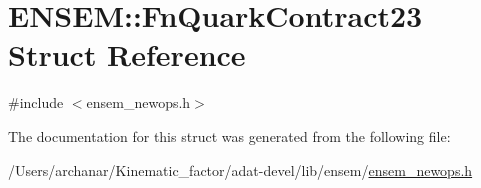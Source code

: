 \hypertarget{structENSEM_1_1FnQuarkContract23}{}\section{E\+N\+S\+EM\+:\+:Fn\+Quark\+Contract23 Struct Reference}
\label{structENSEM_1_1FnQuarkContract23}


{\ttfamily \#include $<$ensem\+\_\+newops.\+h$>$}



The documentation for this struct was generated from the following file\+:\begin{DoxyCompactItemize}
\item 
/\+Users/archanar/\+Kinematic\+\_\+factor/adat-\/devel/lib/ensem/\mbox{\hyperlink{adat-devel_2lib_2ensem_2ensem__newops_8h}{ensem\+\_\+newops.\+h}}\end{DoxyCompactItemize}
